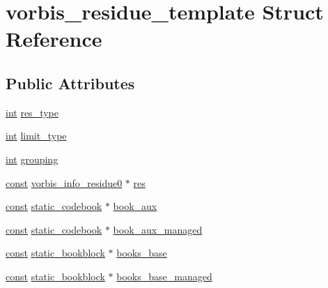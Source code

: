 \hypertarget{structvorbis__residue__template}{}\section{vorbis\+\_\+residue\+\_\+template Struct Reference}
\label{structvorbis__residue__template}
\subsection*{Public Attributes}
\begin{DoxyCompactItemize}
\item 
\hyperlink{xmltok_8h_a5a0d4a5641ce434f1d23533f2b2e6653}{int} \hyperlink{structvorbis__residue__template_a15084c4bd97066e1bf874f93e41db0ea}{res\+\_\+type}
\item 
\hyperlink{xmltok_8h_a5a0d4a5641ce434f1d23533f2b2e6653}{int} \hyperlink{structvorbis__residue__template_a5da353b9dcda20f8e4e7a4f6087675a0}{limit\+\_\+type}
\item 
\hyperlink{xmltok_8h_a5a0d4a5641ce434f1d23533f2b2e6653}{int} \hyperlink{structvorbis__residue__template_ad4e0d91b38da3a639e860eeb75fcd863}{grouping}
\item 
\hyperlink{getopt1_8c_a2c212835823e3c54a8ab6d95c652660e}{const} \hyperlink{structvorbis__info__residue0}{vorbis\+\_\+info\+\_\+residue0} $\ast$ \hyperlink{structvorbis__residue__template_a7b4e0d90fa41a67a95513cfae4adec59}{res}
\item 
\hyperlink{getopt1_8c_a2c212835823e3c54a8ab6d95c652660e}{const} \hyperlink{structstatic__codebook}{static\+\_\+codebook} $\ast$ \hyperlink{structvorbis__residue__template_a1758621ca074816c2a87102461e408fc}{book\+\_\+aux}
\item 
\hyperlink{getopt1_8c_a2c212835823e3c54a8ab6d95c652660e}{const} \hyperlink{structstatic__codebook}{static\+\_\+codebook} $\ast$ \hyperlink{structvorbis__residue__template_ab4ea95da7d287d0dc6df64c957092837}{book\+\_\+aux\+\_\+managed}
\item 
\hyperlink{getopt1_8c_a2c212835823e3c54a8ab6d95c652660e}{const} \hyperlink{structstatic__bookblock}{static\+\_\+bookblock} $\ast$ \hyperlink{structvorbis__residue__template_ad760c5513a8f21ed9ef3284d0d33c488}{books\+\_\+base}
\item 
\hyperlink{getopt1_8c_a2c212835823e3c54a8ab6d95c652660e}{const} \hyperlink{structstatic__bookblock}{static\+\_\+bookblock} $\ast$ \hyperlink{structvorbis__residue__template_a3d33d8f56cfa34dac0c33e11e8323ab6}{books\+\_\+base\+\_\+managed}
\end{DoxyCompactItemize}


